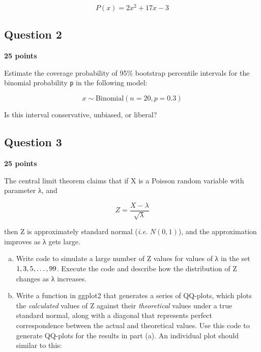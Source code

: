 \documentclass[]{article}
\begin{document}
\[P(x) = 2x^{2} +17x-3\]

\subsection{Question 2}

\textbf{25 points}

Estimate the coverage probability of 95\% bootstrap percentile intervals
for the binomial probability \texttt{p} in the following model:

\[x \sim \text{Binomial}(n=20, p=0.3)\]

Is this interval conservative, unbiased, or liberal?

\subsection{Question 3}

\textbf{25 points}

The central limit theorem claims that if X is a Poisson random variable
with parameter λ, and

\[Z = \frac{X-\lambda}{\sqrt{\lambda}}\]

then Z is approximately standard normal (\emph{i.e.} $N(0,1)$), and the
approximation improves as λ gets large.

\begin{enumerate}[a.]
\item
  Write code to simulate a large number of Z values for values of λ in
  the set $\\{1,3,5,\ldots,99\\}$. Execute the code and describe how the
  distribution of Z changes as λ increases.
\item
  Write a function in ggplot2 that generates a series of QQ-plots, which
  plots the \emph{calculated} values of Z against their
  \emph{theoretical} values under a true standard normal, along with a
  diagonal that represents perfect correspondence between the actual and
  theoretical values. Use this code to generate QQ-plots for the results
  in part (a). An individual plot should similar to this:
\end{enumerate}
\end{document}
